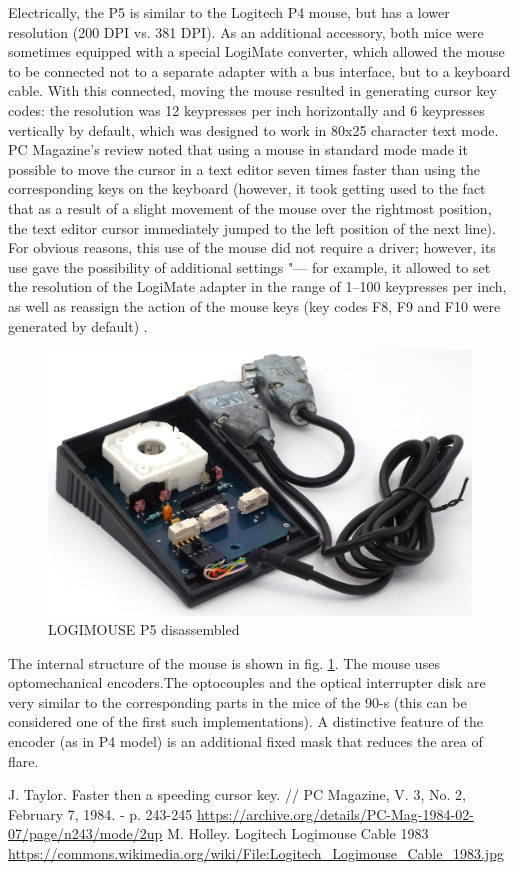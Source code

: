 \documentclass[11pt, a4paper]{article}
\begin{document}
Electrically, the P5 is similar to the Logitech P4 mouse, but has a lower resolution (200 DPI vs. 381 DPI). As an additional accessory, both mice were sometimes equipped with a special LogiMate \cite{oldmouse} converter, which allowed the mouse to be connected not to a separate adapter with a bus interface, but to a keyboard cable. With this connected, moving the mouse resulted in generating cursor key codes:  the resolution was 12 keypresses per inch horizontally and 6 keypresses vertically by default, which was designed to work in 80x25 character text mode. PC Magazine's review noted that using a mouse in standard mode made it possible to move the cursor in a text editor seven times faster than using the corresponding keys on the keyboard (however, it took getting used to the fact that as a result of a slight movement of the mouse over the rightmost position, the text editor cursor immediately jumped to the left position of the next line). For obvious reasons, this use of the mouse did not require a driver; however, its use gave the possibility of additional settings "--- for example, it allowed to set the resolution of the LogiMate adapter in the range of 1--100 keypresses per inch, as well as reassign the action of the mouse keys (key codes F8, F9 and F10 were generated by default) \cite{logimouse}.

 \begin{figure}[h]
    \centering
    \includegraphics[scale=0.7]{1983_logitech_logimouse_p5/inside_30.jpg}
    \caption{LOGIMOUSE P5 disassembled}
    \label{fig:LogimouseP5Inside}
\end{figure}

The internal structure of the mouse is shown in fig. \ref{fig:LogimouseP5Inside}. The mouse uses optomechanical encoders.The optocouples and the optical interrupter disk are very similar to the corresponding parts in the mice of the 90-s (this can be considered one of the first such implementations). A distinctive feature of the encoder (as in P4 model) is an additional fixed mask that reduces the area of flare.

\begin{thebibliography}{9}
 J. Taylor. Faster then a speeding cursor key. // PC Magazine, V. 3, No. 2, February 7, 1984. - p. 243-245 \url{https://archive.org/details/PC-Mag-1984-02-07/page/n243/mode/2up}
 M. Holley. Logitech Logimouse Cable 1983 \url{https://commons.wikimedia.org/wiki/File:Logitech_Logimouse_Cable_1983.jpg}
\end{thebibliography}
\end{document}
